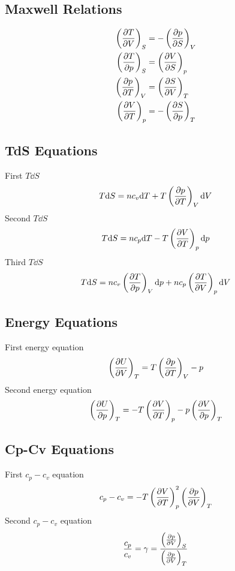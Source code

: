 \documentclass{aa}
\begin{document}
\subsection{Maxwell Relations}
\begin{equation}
	\begin{aligned}
		\left( \pdv{T}{V} \right)_S&= -\left( \pdv{p}{S} \right)_V\\
		\left( \pdv{T}{p}\right)_S&= \left( \pdv{V}{S} \right)_p\\
		\left( \pdv{p}{T} \right)_V&= \left( \pdv{S}{V} \right)_T\\
		\left( \pdv{V}{T} \right)_p&= -\left( \pdv{S}{p} \right)_T
	\end{aligned}
\end{equation}
\subsection{TdS Equations}
First $T\dd S$
\begin{equation}
	T\dd S=nc_v\dd T+T\left( \pdv{p}{T} \right)_V\dd V
\end{equation}
Second $T\dd S$
\begin{equation}
	T\dd S= nc_p\dd T-T\left( \pdv{V}{T} \right)_p\dd p
\end{equation}
Third $T\dd S$
\begin{equation}
	T\dd S=nc_v\left( \pdv{T}{p} \right)_V\dd p+nc_p\left( \pdv{T}{V} \right)_p\dd V
\end{equation}
\subsection{Energy Equations}
First energy equation
\begin{equation}
	\left( \pdv{U}{V} \right)_T=T\left( \pdv{p}{T} \right)_V-p
\end{equation}
Second energy equation
\begin{equation}
	\left( \pdv{U}{p} \right)_T=-T\left( \pdv{V}{T} \right)_p-p\left( \pdv{V}{p} \right)_T
\end{equation}
\subsection{Cp-Cv Equations}
First $c_p-c_v$ equation
\begin{equation}
	c_p-c_v=-T\left( \pdv{V}{T} \right)^2_p\left( \pdv{p}{V} \right)_T
\end{equation}
Second $c_p-c_v$ equation
\begin{equation}
\frac{c_p}{c_v}=\gamma=\frac{\left( \pdv{p}{V} \right)_S}{\left(\pdv{p}{V}\right)_T}
\end{equation}
\end{document}
